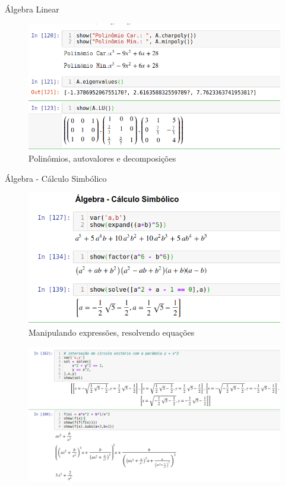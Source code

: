 \documentclass[12pt]{beamer}
\begin{document}
\begin{frame}
  {Álgebra Linear}
  \begin{figure}[h]
    \centering
    \includegraphics[scale=.4]{img/matrizes02.png}
    \caption{Polinômios, autovalores e decomposições}
    \label{img:alglin}
  \end{figure}
\end{frame}

\begin{frame}
  {Álgebra - Cálculo Simbólico}
  \begin{figure}[h]
    \centering
    \includegraphics[scale=.5]{img/algebra01.png}
    \caption{Manipulando expressões, resolvendo equações }
    \label{img:fatorando}
  \end{figure}
\end{frame}

\begin{frame}
  \begin{figure}[h]
    \centering
    \includegraphics[scale=0.4]{img/algebra02.png}
    \label{img:algebra02}
  \end{figure}
\end{frame}
\end{document}
